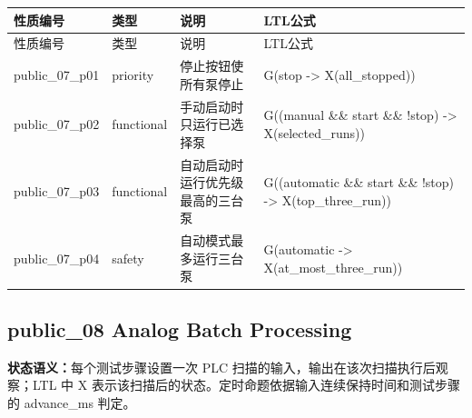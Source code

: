 \begin{longtable}{L{2.3cm}L{1.7cm}L{4.1cm}L{5.2cm}}

\toprule

性质编号 & 类型 & 说明 & LTL公式\\

\midrule

\endfirsthead

\toprule

性质编号 & 类型 & 说明 & LTL公式\\

\midrule

\endhead

{\ttfamily public\_07\_p01} & priority & 停止按钮使所有泵停止 & {\ttfamily G(stop -> X(all\_stopped))}\\

{\ttfamily public\_07\_p02} & functional & 手动启动时只运行已选择泵 & {\ttfamily G((manual \&\& start \&\& !stop) -> X(selected\_runs))}\\

{\ttfamily public\_07\_p03} & functional & 自动启动时运行优先级最高的三台泵 & {\ttfamily G((automatic \&\& start \&\& !stop) -> X(top\_three\_run))}\\

{\ttfamily public\_07\_p04} & safety & 自动模式最多运行三台泵 & {\ttfamily G(automatic -> X(at\_most\_three\_run))}\\

\bottomrule

\end{longtable}

\subsection{{\ttfamily public\_08} Analog Batch Processing}

\noindent\textbf{状态语义：}每个测试步骤设置一次 PLC 扫描的输入，输出在该次扫描执行后观察；LTL 中 X 表示该扫描后的状态。定时命题依据输入连续保持时间和测试步骤的 advance\_ms 判定。

